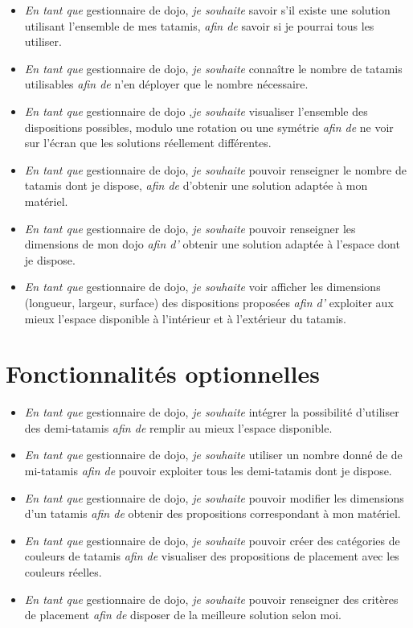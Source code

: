 \begin{itemize}
    \item \emph{En tant que} gestionnaire de dojo, \emph{ je souhaite} savoir s'il existe une solution utilisant l'ensemble de mes tatamis,
    \emph{afin de } savoir si je pourrai tous les utiliser.
    \item \emph{En tant que} gestionnaire de dojo,\emph{ je souhaite} connaître le nombre de tatamis utilisables \emph{ afin de }
     n'en déployer que le nombre nécessaire.
    \item \emph{En tant que} gestionnaire de dojo  ,\emph{je souhaite} visualiser l'ensemble des dispositions possibles, modulo une rotation ou une symétrie
    \emph{afin de } ne voir sur l'écran que les solutions réellement différentes.
    \item \emph{En tant que} gestionnaire de dojo, \emph{ je souhaite} pouvoir renseigner le nombre de tatamis dont je dispose,
    \emph{afin de } d'obtenir une solution adaptée à mon matériel.
    \item \emph{En tant que} gestionnaire de dojo,\emph{ je souhaite} pouvoir renseigner les dimensions de mon dojo \emph{ afin d'}
     obtenir une solution adaptée à l'espace dont je dispose.    
    \item \emph{En tant que} gestionnaire de dojo,\emph{ je souhaite} voir afficher les dimensions (longueur, largeur, surface) des dispositions 
    proposées  \emph{ afin d' }exploiter aux mieux l'espace disponible à l'intérieur et à l'extérieur du tatamis.
\end{itemize}


\section{Fonctionnalités optionnelles}

\begin{itemize}
    \item \emph{En tant que } gestionnaire de dojo,\emph{ je souhaite} intégrer la possibilité d'utiliser des demi-tatamis 
    \emph{ afin de } remplir au mieux l'espace disponible.
    \item \emph{En tant que } gestionnaire de dojo,\emph{ je souhaite} utiliser un nombre donné de de mi-tatamis 
    \emph{ afin de } pouvoir exploiter tous les demi-tatamis dont je dispose. 
    \item \emph{En tant que } gestionnaire de dojo,\emph{ je souhaite} pouvoir modifier les dimensions d'un tatamis
     \emph{ afin de } obtenir des propositions correspondant à mon matériel.
    \item \emph{En tant que } gestionnaire de dojo,\emph{ je souhaite} pouvoir créer des catégories de couleurs de tatamis
     \emph{ afin de } visualiser des propositions de placement avec les couleurs réelles.
    \item \emph{En tant que } gestionnaire de dojo,\emph{ je souhaite} pouvoir renseigner des critères de placement
     \emph{ afin de } disposer de la meilleure solution selon moi.
\end{itemize}